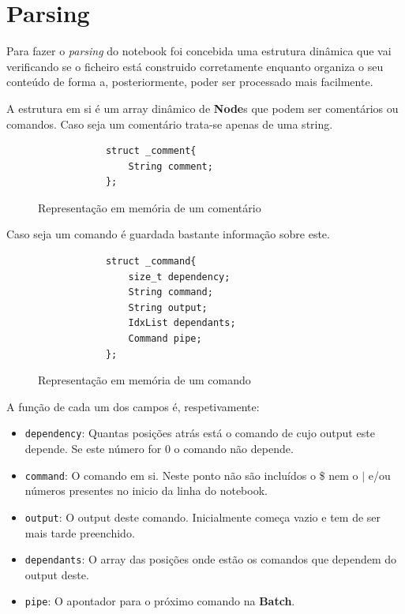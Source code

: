 \documentclass[12pt,a4paper]{report}
\begin{document}
\chapter{Parsing}
    Para fazer o \textit{parsing} do notebook foi concebida uma estrutura
    dinâmica que vai verificando se o ficheiro está construido corretamente
    enquanto organiza o seu conteúdo de forma a, posteriormente, poder ser
    processado mais facilmente.

    A estrutura em si é um array dinâmico de \textbf{Node}s que podem ser
    comentários ou comandos. Caso seja um comentário trata-se apenas de
    uma string.
    \begin{figure}[h]
        \centering
        \begin{verbatim}
            struct _comment{
                String comment;
            };
        \end{verbatim}
        \caption{Representação em memória de um comentário}
        \label{fig:commentStruct}
    \end{figure}

    Caso seja um comando é guardada bastante informação sobre este.
    \begin{figure}[h]
        \centering
        \begin{verbatim}
            struct _command{
                size_t dependency;
                String command;
                String output;
                IdxList dependants;
                Command pipe;
            };
        \end{verbatim}
        \caption{Representação em memória de um comando}
    \end{figure}

    A função de cada um dos campos é, respetivamente:
    \begin{itemize}
        \item \texttt{dependency}: Quantas posições atrás está o comando
            de cujo output este depende. Se este número for 0 o comando não
            depende.

        \item \texttt{command}: O comando em si. Neste ponto não são
            incluídos o \$ nem o $|$ e/ou números presentes no inicio da linha
            do notebook.

        \item \texttt{output}: O output deste comando. Inicialmente
            começa vazio e tem de ser mais tarde preenchido.

        \item \texttt{dependants}: O array das posições onde estão os
            comandos que dependem do output deste.

        \item \texttt{pipe}: O apontador para o próximo comando na
            \textbf{Batch}.
    \end{itemize}
\end{document}
